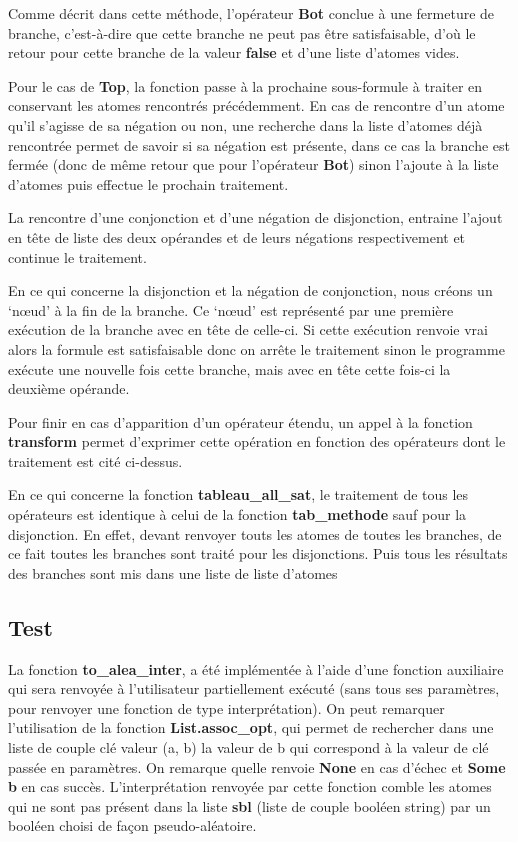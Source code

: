 \documentclass[12pt]{article}
\begin{document}
    Comme décrit dans cette méthode, l'opérateur \textbf{Bot} conclue à une 
    fermeture de branche, c'est-à-dire que cette branche ne peut pas être 
    satisfaisable, d'où le retour pour cette branche de la valeur 
    \textbf{false} et d'une liste d'atomes vides. 

    Pour le cas de \textbf{Top}, la fonction passe à la prochaine sous-formule à
    traiter en conservant les atomes rencontrés précédemment. En cas de 
    rencontre d'un atome qu'il s'agisse de sa négation ou non, une recherche 
    dans la liste d'atomes déjà rencontrée permet de savoir si sa négation est 
    présente, dans ce cas la branche est fermée (donc de même retour que pour 
    l'opérateur \textbf{Bot}) sinon l'ajoute à la liste d'atomes puis effectue 
    le prochain traitement. 
    
    La rencontre d'une conjonction et d'une négation de disjonction, entraine 
    l'ajout en tête de liste des deux opérandes et de leurs négations 
    respectivement et continue le traitement.

    En ce qui concerne la disjonction et la négation de conjonction, nous créons 
    un `nœud' à la fin de la branche. Ce `nœud' est représenté par une première
    exécution de la branche avec en tête de celle-ci. Si cette exécution renvoie
    vrai alors la formule est satisfaisable donc on arrête le traitement sinon 
    le programme exécute une nouvelle fois cette branche, mais avec en tête 
    cette fois-ci la deuxième opérande. 

    Pour finir en cas d'apparition d'un opérateur étendu, un appel à la fonction 
    \textbf{transform} permet d'exprimer cette opération en fonction des 
    opérateurs dont le traitement est cité ci-dessus.

    En ce qui concerne la fonction \textbf{tableau\_all\_sat}, le traitement de 
    tous les opérateurs est identique à celui de la fonction 
    \textbf{tab\_methode} sauf pour la disjonction. En effet, devant renvoyer 
    touts les atomes de toutes les branches, de ce fait toutes les branches sont 
    traité pour les disjonctions. Puis tous les résultats des branches sont mis 
    dans une liste de liste d'atomes

    \subsection{Test}

    La fonction \textbf{to\_alea\_inter}, a été implémentée à l'aide d'une 
    fonction auxiliaire qui sera renvoyée à l'utilisateur partiellement 
    exécuté (sans tous ses paramètres, pour renvoyer une fonction de type 
    interprétation). On peut remarquer l'utilisation de la fonction 
    \textbf{List.assoc\_opt}, qui permet de rechercher dans une liste de couple 
    clé valeur (a, b) la valeur de b qui correspond à la valeur de clé passée en 
    paramètres. On remarque quelle renvoie \textbf{None} en cas d'échec et 
    \textbf{Some b} en cas succès. L'interprétation renvoyée par cette fonction 
    comble les atomes qui ne sont pas présent dans la liste \textbf{sbl} (liste 
    de couple booléen string) par un booléen choisi de façon pseudo-aléatoire.
\end{document}
